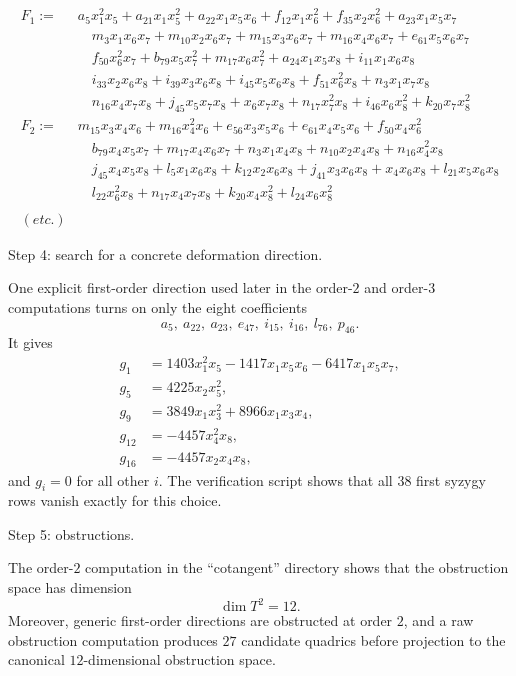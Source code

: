 \begingroup\footnotesize
$$
\begin{aligned}
F_1:=\ &a_5x_1^2x_5 + a_{21}x_1x_5^2 + a_{22}x_1x_5x_6 + f_{12}x_1x_6^2 + f_{35}x_2x_6^2 + a_{23}x_1x_5x_7\\
&\quad m_3x_1x_6x_7 + m_{10}x_2x_6x_7 + m_{15}x_3x_6x_7 + m_{16}x_4x_6x_7 + e_{61}x_5x_6x_7\\
&\quad f_{50}x_6^2x_7 + b_{79}x_5x_7^2 + m_{17}x_6x_7^2 + a_{24}x_1x_5x_8 + i_{11}x_1x_6x_8\\
&\quad i_{33}x_2x_6x_8 + i_{39}x_3x_6x_8 + i_{45}x_5x_6x_8 + f_{51}x_6^2x_8 + n_3x_1x_7x_8\\
&\quad n_{16}x_4x_7x_8 + j_{45}x_5x_7x_8 + x_6x_7x_8 + n_{17}x_7^2x_8 + i_{46}x_6x_8^2 + k_{20}x_7x_8^2\\
F_2:=\ &m_{15}x_3x_4x_6 + m_{16}x_4^2x_6 + e_{56}x_3x_5x_6 + e_{61}x_4x_5x_6 + f_{50}x_4x_6^2\\
&\quad b_{79}x_4x_5x_7 + m_{17}x_4x_6x_7 + n_3x_1x_4x_8 + n_{10}x_2x_4x_8 + n_{16}x_4^2x_8\\
&\quad j_{45}x_4x_5x_8 + l_5x_1x_6x_8 + k_{12}x_2x_6x_8 + j_{41}x_3x_6x_8 + x_4x_6x_8 + l_{21}x_5x_6x_8\\
&\quad l_{22}x_6^2x_8 + n_{17}x_4x_7x_8 +
k_{20}x_4x_8^2 + l_{24}x_6x_8^2\\ \\
(etc.)
\end{aligned}
$$

\noindent
\endgroup

\medskip\noindent
Step 4: search for a concrete deformation direction.

\medskip\noindent
One explicit first-order direction used later in the
order-$2$ and order-$3$ computations turns on only
the eight coefficients
$$
a_5,\ a_{22},\ a_{23},\ e_{47},\ i_{15},\ i_{16},\ l_{76},\ p_{46}.
$$
It gives
$$
\begin{aligned}
g_1&=1403x_1^2x_5-1417x_1x_5x_6-6417x_1x_5x_7,\\
g_5&=4225x_2x_5^2,\\
g_9&=3849x_1x_3^2+8966x_1x_3x_4,\\
g_{12}&=-4457x_4^2x_8,\\
g_{16}&=-4457x_2x_4x_8,
\end{aligned}
$$
and $g_i=0$ for all other $i$.
The verification script shows that all $38$ first syzygy rows
vanish exactly for this choice.

\medskip\noindent
Step 5: obstructions.

\medskip\noindent
The order-$2$ computation in the ``cotangent''
directory shows that the obstruction space has
dimension
$$
\dim T^2=12.
$$
Moreover, generic first-order directions are obstructed
at order $2$, and a raw obstruction computation produces
$27$ candidate quadrics before projection to the canonical
$12$-dimensional obstruction space.

